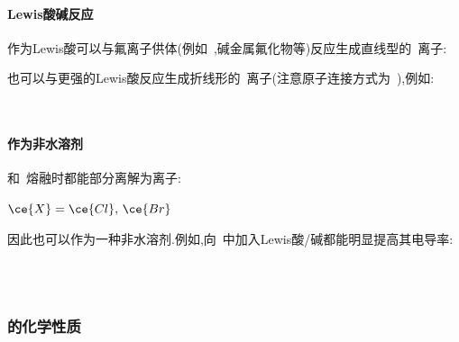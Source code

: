 \documentclass{ctexbook}
\begin{document}
\paragraph{Lewis酸碱反应}
作为Lewis酸可以与氟离子供体(例如~,碱金属氟化物等)反应生成直线型的~\ce{[ClF2]-}离子:
\begin{tightcenter}
\end{tightcenter}
也可以与更强的Lewis酸反应生成折线形的~\ce{[Cl2F]+}离子(注意原子连接方式为~\ce{[Cl-Cl-F]+}),例如:
\begin{tightcenter}
    \\
\end{tightcenter}
\paragraph{作为非水溶剂}
\indent{}和~熔融时都能部分离解为离子:
\begin{tightcenter}
    \quad$\ce{X}=\ce{Cl},\,\ce{Br}$
\end{tightcenter}
因此也可以作为一种非水溶剂.例如,向~中加入Lewis酸/碱都能明显提高其电导率:
\begin{tightcenter}
    \\
    \quad{}\\
    \quad{}
\end{tightcenter}
\subsubsection{的化学性质}
\end{document}
